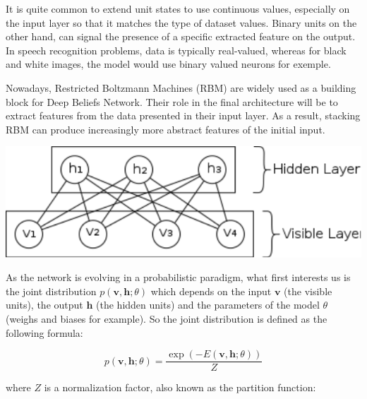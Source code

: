 \documentclass{report}
\begin{document}
	It is quite common to extend unit states to use continuous values, especially 
	on the input layer so that it matches the type of dataset values. Binary units 
	on the other hand, can signal the presence of a specific extracted feature on 
	the output. In speech recognition problems, data is typically real-valued, 
	whereas for black and white images, the model would use binary valued neurons for exemple.
	
	Nowadays, Restricted Boltzmann Machines (RBM) are widely used as a 
	building block for Deep Beliefs Network. Their role in the final architecture 
	will be to extract features from the data presented in their input layer. 
	As a result, stacking RBM can produce increasingly more abstract features of
	the initial input. 
	
	\vspace{0.5cm}
	\begin{center}
		\includegraphics[scale=0.5]{ressources/rbm}
		\vspace{0.3cm}
	\end{center}
	\vspace{0.5cm}
	
	As the network is evolving in a probabilistic paradigm, what first interests us 
	is the joint distribution $p(\textbf{v}, \textbf{h}; \theta )$ which depends on the 
	input $\textbf{v}$ (the visible units), the output $\textbf{h}$ (the hidden units) and the parameters 
	of the model $\theta$ (weighs and biases for example). So the joint distribution 
	is defined as the following formula:
	
	\vspace{0.5cm}
	\begin{equation} p (\textbf{v}, \textbf{h}; \theta )
	= \frac{\exp (-E (\textbf{v}, \textbf{h}; \theta))}{Z}
	\end{equation}
	\vspace{0.5cm}
	
	where $Z$ is a normalization factor, also known as the partition function:
	
\end{document}
